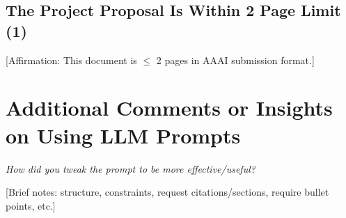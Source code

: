\documentclass[letterpaper]{article} %
\begin{document}
\subsection{The Project Proposal Is Within 2 Page Limit (1)}
[Affirmation: This document is $\leq$ 2 pages in AAAI submission format.]

\section{Additional Comments or Insights on Using LLM Prompts}
\textit{How did you tweak the prompt to be more effective/useful?}

[Brief notes: structure, constraints, request citations/sections, require bullet points, etc.]

% 

\end{document}
